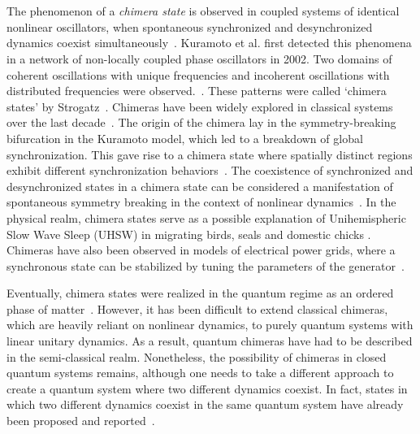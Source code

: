 \documentclass[12pt]{iopart}
\providecommand{\DIFaddtex}[1]{{\protect\color{red}\uwave{#1}}} %
\providecommand{\DIFdeltex}[1]{{}}                      %
\providecommand{\DIFaddbegin}{} %
\providecommand{\DIFaddend}{} %
\providecommand{\DIFdelbegin}{} %
\providecommand{\DIFdelend}{} %
\providecommand{\DIFadd}[1]{\texorpdfstring{\DIFaddtex{#1}}{#1}} %
\providecommand{\DIFdel}[1]{\texorpdfstring{\DIFdeltex{#1}}{}} %
\newcommand{\DIFscaledelfig}{0.5}
\newlength{\DIFdelgraphicswidth} %
\newlength{\DIFdelgraphicsheight} %
\newcommand{\DIFaddincludegraphics}[2][]{{\color{blue}\fbox{\DIFOincludegraphics[#1]{#2}}}} %
\newcommand{\DIFdelincludegraphics}[2][]{%
\sbox{\DIFdelgraphicsbox}{\DIFOincludegraphics[#1]{#2}}%
\settoboxwidth{\DIFdelgraphicswidth}{\DIFdelgraphicsbox} %
\settoboxtotalheight{\DIFdelgraphicsheight}{\DIFdelgraphicsbox} %
\scalebox{\DIFscaledelfig}{%
\parbox[b]{\DIFdelgraphicswidth}{\usebox{\DIFdelgraphicsbox}\\[-\baselineskip] \rule{\DIFdelgraphicswidth}{0em}}\llap{\resizebox{\DIFdelgraphicswidth}{\DIFdelgraphicsheight}{%
\setlength{\unitlength}{\DIFdelgraphicswidth}%
\begin{picture}(1,1)%
\thicklines\linethickness{2pt} %
{\color[rgb]{1,0,0}\put(0,0){\framebox(1,1){}}}%
{\color[rgb]{1,0,0}\put(0,0){\line( 1,1){1}}}%
{\color[rgb]{1,0,0}\put(0,1){\line(1,-1){1}}}%
\end{picture}%
}\hspace*{3pt}}} %
} %
\DeclareRobustCommand{\DIFaddbegin}{\DIFOaddbegin \let\includegraphics\DIFaddincludegraphics} %
\DeclareRobustCommand{\DIFaddend}{\DIFOaddend \let\includegraphics\DIFOincludegraphics} %
\DeclareRobustCommand{\DIFdelbegin}{\DIFOdelbegin \let\includegraphics\DIFdelincludegraphics} %
\DeclareRobustCommand{\DIFdelend}{\DIFOaddend \let\includegraphics\DIFOincludegraphics} %
\begin{document}
	
\DIFaddbegin \section{\label{sec:intro} \DIFadd{Introduction}}
\DIFaddend The phenomenon of a \textit{ chimera state} is observed in coupled systems of  identical nonlinear oscillators, when spontaneous synchronized and desynchronized dynamics coexist simultaneously~\cite{kuramoto_coexistence_2002, panaggio_chimera_2015}. Kuramoto et al. first detected this phenomena in a network of non-locally coupled phase oscillators in 2002. Two domains of coherent oscillations with unique frequencies and incoherent oscillations with distributed frequencies were observed.~\cite{kuramoto_coexistence_2002}. These patterns were called ‘chimera states’ by Strogatz~\cite{chimera:strogatz}. Chimeras have been widely explored in classical systems over the last decade~\cite{parastesh_chimeras_2021,chimera_book, taniya2022}. The origin of the chimera lay in the symmetry-breaking bifurcation in the Kuramoto model, which led to a breakdown of global synchronization. This gave rise to a chimera state where spatially distinct regions exhibit different synchronization behaviors~\cite{Kotwal2017}. The coexistence of synchronized and desynchronized states in a chimera state can be considered a manifestation of spontaneous symmetry breaking in the context of nonlinear dynamics~\cite{Aneta2013}. In the physical realm, chimera states serve as a possible explanation of Unihemispheric Slow Wave Sleep (UHSW) in migrating birds, seals and domestic chicks \cite{Rattenborg2000, Rattenborg2006, Rattenborg2016}. 
Chimeras have also been observed in models of electrical power grids, where a synchronous state can be stabilized by tuning the parameters of the generator~\DIFdelbegin \DIFdel{\mbox{%
\cite{Motter2013}}\hspace{0pt}%
}\DIFdelend \DIFaddbegin \DIFadd{\mbox{%
\cite{Deng_2024, Motter2013}}\hspace{0pt}%
}\DIFaddend . 

Eventually, chimera states were realized in the quantum regime as an ordered phase of matter~\cite{bastidas_quantum_2015}. However, it has been difficult to extend classical chimeras, which are heavily reliant on nonlinear dynamics, to purely quantum systems with linear unitary dynamics. As a result, quantum chimeras have had to be described in the semi-classical realm. Nonetheless, the possibility of chimeras in closed quantum systems remains, although one needs to take a different approach to create a quantum system where two different dynamics coexist. In fact, states in which two different dynamics coexist in the same quantum system have already been proposed and reported~\cite{Bastidas2018, Zha2020, sakurai_phys_nodate}.
\end{document}
